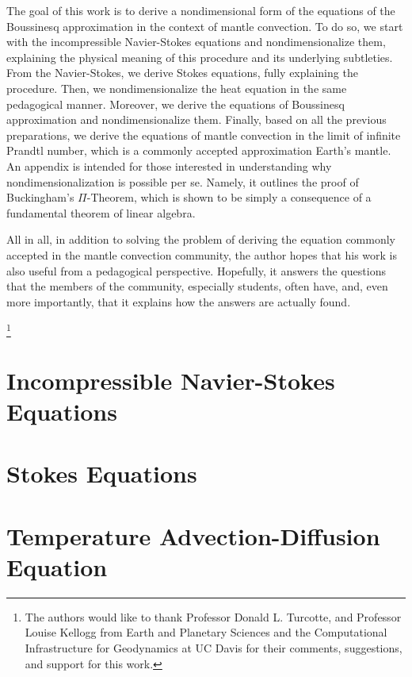 \documentclass[oneside]{amsbook}
\theoremstyle{definition}
\theoremstyle{remark}
\numberwithin{section}{chapter}
\numberwithin{equation}{chapter}
\begin{document}
The goal of this work is to derive a nondimensional form of the equations of the Boussinesq approximation in the context of mantle convection. To do so, we start with the incompressible Navier-Stokes equations and nondimensionalize them, explaining the physical meaning of this procedure and its underlying subtleties. From the Navier-Stokes, we derive Stokes equations, fully explaining the procedure. Then, we nondimensionalize the heat equation in the same pedagogical manner. Moreover, we derive the equations of Boussinesq approximation and nondimensionalize them. Finally, based on all the previous preparations, we derive the equations of mantle convection in the limit of infinite Prandtl number, which is a commonly accepted approximation Earth's mantle. An appendix is intended for those interested in understanding why nondimensionalization is possible per se. Namely, it outlines the proof of Buckingham's $\Pi$-Theorem, which is shown to be simply a consequence of a fundamental theorem of linear algebra.

All in all, in addition to solving the problem of deriving the equation commonly accepted in the mantle convection community, the author hopes that his work is also useful from a pedagogical perspective. Hopefully, it answers the questions that the members of the community, especially students, often have, and, even more importantly, that it explains how the answers are actually found.

\thanks{The authors would like to thank Professor Donald L. Turcotte, and Professor Louise Kellogg from Earth and Planetary Sciences and the Computational Infrastructure for Geodynamics at UC Davis for their comments, suggestions, and support for this work.}

\chapter{Incompressible Navier-Stokes Equations} \label{navier_stokes}


\chapter{Stokes Equations} \label{stokes}


\chapter{Temperature Advection-Diffusion Equation} \label{heat}

\end{document}
